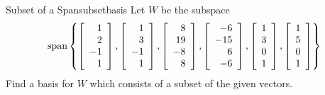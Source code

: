 \begin{example}{Subset of a Span}{subsetbasis}
Let $W$ be the subspace 
\begin{equation*}
\mbox{span}\left\{ \left[ 
\begin{array}{r}
1 \\ 
2 \\ 
-1 \\ 
1
\end{array}
\right] ,\left[ 
\begin{array}{r}
1 \\ 
3 \\ 
-1 \\ 
1
\end{array}
\right] ,\left[ 
\begin{array}{r}
8 \\ 
19 \\ 
-8 \\ 
8
\end{array}
\right] ,\left[ 
\begin{array}{r}
-6 \\ 
-15 \\ 
6 \\ 
-6
\end{array}
\right] ,\left[ 
\begin{array}{r}
1 \\ 
3 \\ 
0 \\ 
1
\end{array}
\right] ,\left[ 
\begin{array}{r}
1 \\ 
5 \\ 
0 \\ 
1
\end{array}
\right] \right\}
\end{equation*}
Find a basis for $W$ which consists of a subset of the given vectors.
\end{example}

